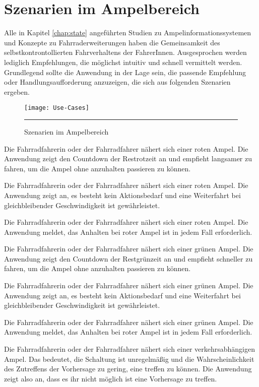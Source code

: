 \chapter{\label{chap:szenarien}Szenarien im Ampelbereich}
Alle in Kapitel \ref{chap:state} angeführten Studien zu Ampelinformationssystemen und Konzepte zu Fahrraderweiterungen haben die Gemeinsamkeit des selbstkontrontollierten Fahrverhaltens der FahrerInnen. Ausgesprochen werden lediglich Empfehlungen, die möglichst intuitiv und schnell vermittelt werden. Grundlegend sollte die Anwendung in der Lage sein, die passende Empfehlung oder Handlungsaufforderung anzuzeigen, die sich aus folgenden Szenarien ergeben.
\begin{figure}[H]  
    \centering  
    \texttt{[image: Use-Cases]} 
    \rule{35em}{0.5pt}
    \caption[Szenarien]{Szenarien im Ampelbereich}
    \label{fig:szenarien}
\end{figure}
\begin{description}[leftmargin=0.7cm,style=nextline]
\item[Szenario R1:] 
Die Fahrradfahrerin oder der Fahrradfahrer nähert sich einer roten Ampel. Die Anwendung zeigt den Countdown der Restrotzeit an und empfieht langsamer zu fahren, um die Ampel ohne anzuhalten passieren zu können.  \\
\item[Szenario R2:] 
Die Fahrradfahrerin oder der Fahrradfahrer nähert sich einer roten Ampel. Die Anwendung zeigt an, es besteht kein Aktionsbedarf und eine Weiterfahrt bei gleichbleibender Geschwindigkeit ist gewährleistet. \\
\item[Szenario R3:] 
Die Fahrradfahrerin oder der Fahrradfahrer nähert sich einer roten Ampel. Die Anwendung meldet, das Anhalten bei roter Ampel ist in jedem Fall erforderlich.\\
\item[Szenario G1:] 
Die Fahrradfahrerin oder der Fahrradfahrer nähert sich einer grünen Ampel. Die Anwendung zeigt den Countdown der Restgrünzeit an und empfieht schneller zu fahren, um die Ampel ohne anzuhalten passieren zu können.\\
\item[Szenario G2:] 
Die Fahrradfahrerin oder der Fahrradfahrer nähert sich einer grünen Ampel. Die Anwendung zeigt an, es besteht kein Aktionsbedarf und eine Weiterfahrt bei gleichbleibender Geschwindigkeit ist gewährleistet.\\ 
\item[Szenario G3:] 
Die Fahrradfahrerin oder der Fahrradfahrer nähert sich einer grünen Ampel. Die Anwendung meldet, das Anhalten bei roter Ampel ist in jedem Fall erforderlich.\\
\item[Szenario V1:] 
Die Fahrradfahrerin oder der Fahrradfahrer nähert sich einer verkehrsabhängigen Ampel. Das bedeutet, die Schaltung ist unregelmäßig und die Wahrscheinlichkeit des Zutreffens der Vorhersage zu gering, eine treffen zu können. Die Anwendung zeigt also an, dass es ihr nicht möglich ist eine Vorhersage zu treffen.\\ 
\end{description} \vspace{27pt}
